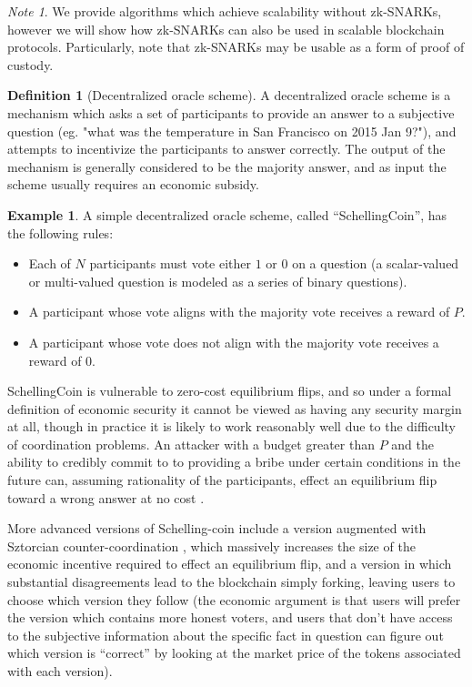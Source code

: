 \documentclass[11pt,a4paper]{report}
\theoremstyle{plain}
\theoremstyle{definition}
\newtheorem{defn}{Definition}[chapter]
\newtheorem{exmp}{Example}[section]
\theoremstyle{remark}
\newtheorem*{note}{Note}
\begin{document}
\begin{note}
We provide algorithms which achieve scalability without zk-SNARKs, however we will show how zk-SNARKs can also be used in scalable blockchain protocols. Particularly, note that zk-SNARKs may be usable as a form of proof of custody.
\end{note}

\begin{defn}[Decentralized oracle scheme]
A decentralized oracle scheme is a mechanism which asks a set of participants to provide an answer to a subjective question (eg. "what was the temperature in San Francisco on 2015 Jan 9?"), and attempts to incentivize the participants to answer correctly. The output of the mechanism is generally considered to be the majority answer, and as input the scheme usually requires an economic subsidy.
\end{defn}

\begin{exmp}
A simple decentralized oracle scheme, called ``SchellingCoin'', has the following rules:
\begin{itemize}
\item
Each of $N$ participants must vote either $1$ or $0$ on a question (a scalar-valued or multi-valued question is modeled as a series of binary questions).
\item
A participant whose vote aligns with the majority vote receives a reward of $P$.
\item
A participant whose vote does not align with the majority vote receives a reward of $0$.
\end{itemize}
SchellingCoin is vulnerable to zero-cost equilibrium flips, and so under a formal definition of economic security it cannot be viewed as having any security margin at all, though in practice it is likely to work reasonably well due to the difficulty of coordination problems. An attacker with a budget greater than $P$ and the ability to credibly commit to to providing a bribe under certain conditions in the future can, assuming rationality of the participants, effect an equilibrium flip toward a wrong answer at no cost \cite{pepsilon}.

More advanced versions of Schelling-coin include a version augmented with Sztorcian counter-coordination \cite{sztorc}, which massively increases the size of the economic incentive required to effect an equilibrium flip, and a version in which substantial disagreements lead to the blockchain simply forking, leaving users to choose which version they follow (the economic argument is that users will prefer the version which contains more honest voters, and users that don't have access to the subjective information about the specific fact in question can figure out which version is ``correct'' by looking at the market price of the tokens associated with each version).
\end{exmp}
\end{document}
